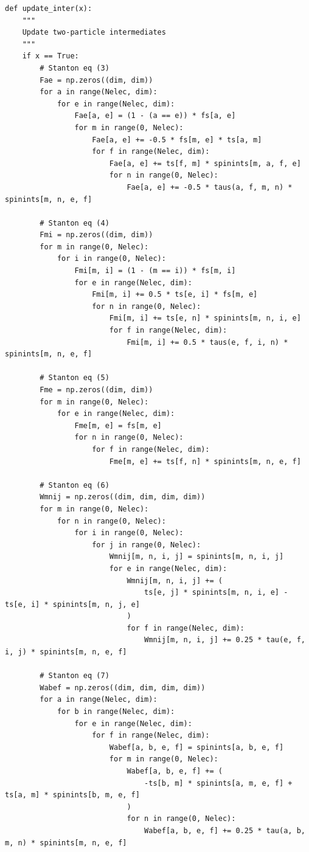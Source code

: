 \begin{lstlisting}[style=MyPython]
def update_inter(x):
    """
    Update two-particle intermediates
    """
    if x == True:
        # Stanton eq (3)
        Fae = np.zeros((dim, dim))
        for a in range(Nelec, dim):
            for e in range(Nelec, dim):
                Fae[a, e] = (1 - (a == e)) * fs[a, e]
                for m in range(0, Nelec):
                    Fae[a, e] += -0.5 * fs[m, e] * ts[a, m]
                    for f in range(Nelec, dim):
                        Fae[a, e] += ts[f, m] * spinints[m, a, f, e]
                        for n in range(0, Nelec):
                            Fae[a, e] += -0.5 * taus(a, f, m, n) * spinints[m, n, e, f]

        # Stanton eq (4)
        Fmi = np.zeros((dim, dim))
        for m in range(0, Nelec):
            for i in range(0, Nelec):
                Fmi[m, i] = (1 - (m == i)) * fs[m, i]
                for e in range(Nelec, dim):
                    Fmi[m, i] += 0.5 * ts[e, i] * fs[m, e]
                    for n in range(0, Nelec):
                        Fmi[m, i] += ts[e, n] * spinints[m, n, i, e]
                        for f in range(Nelec, dim):
                            Fmi[m, i] += 0.5 * taus(e, f, i, n) * spinints[m, n, e, f]

        # Stanton eq (5)
        Fme = np.zeros((dim, dim))
        for m in range(0, Nelec):
            for e in range(Nelec, dim):
                Fme[m, e] = fs[m, e]
                for n in range(0, Nelec):
                    for f in range(Nelec, dim):
                        Fme[m, e] += ts[f, n] * spinints[m, n, e, f]

        # Stanton eq (6)
        Wmnij = np.zeros((dim, dim, dim, dim))
        for m in range(0, Nelec):
            for n in range(0, Nelec):
                for i in range(0, Nelec):
                    for j in range(0, Nelec):
                        Wmnij[m, n, i, j] = spinints[m, n, i, j]
                        for e in range(Nelec, dim):
                            Wmnij[m, n, i, j] += (
                                ts[e, j] * spinints[m, n, i, e] - ts[e, i] * spinints[m, n, j, e]
                            )
                            for f in range(Nelec, dim):
                                Wmnij[m, n, i, j] += 0.25 * tau(e, f, i, j) * spinints[m, n, e, f]

        # Stanton eq (7)
        Wabef = np.zeros((dim, dim, dim, dim))
        for a in range(Nelec, dim):
            for b in range(Nelec, dim):
                for e in range(Nelec, dim):
                    for f in range(Nelec, dim):
                        Wabef[a, b, e, f] = spinints[a, b, e, f]
                        for m in range(0, Nelec):
                            Wabef[a, b, e, f] += (
                                -ts[b, m] * spinints[a, m, e, f] + ts[a, m] * spinints[b, m, e, f]
                            )
                            for n in range(0, Nelec):
                                Wabef[a, b, e, f] += 0.25 * tau(a, b, m, n) * spinints[m, n, e, f]


\end{lstlisting}
